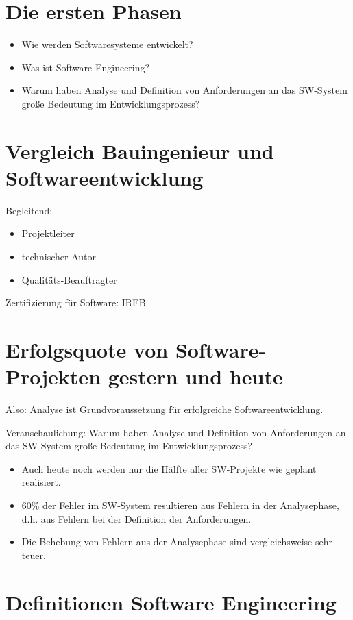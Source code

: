 \section{Die ersten Phasen}
\begin{itemize}
\item Wie werden Softwaresysteme entwickelt?
\item Was ist Software-Engineering?
\item Warum haben Analyse und Definition von Anforderungen an das SW-System große Bedeutung im Entwicklungsprozess?
\end{itemize}

\section{Vergleich Bauingenieur und Softwareentwicklung}
Begleitend:
\begin{itemize}
\item Projektleiter
\item technischer Autor
\item Qualitäts-Beauftragter
\end{itemize}
Zertifizierung für Software: IREB

\section{Erfolgsquote von Software-Projekten gestern und heute}
Also: Analyse ist Grundvoraussetzung für erfolgreiche Softwareentwicklung.

Veranschaulichung:
Warum haben Analyse und Definition von Anforderungen an das SW‐System große Bedeutung
im Entwicklungsprozess?
\begin{itemize}
\item Auch heute noch werden nur die Hälfte aller SW‐Projekte wie geplant realisiert.
\item 60\% der Fehler im SW‐System resultieren aus Fehlern in der Analysephase, d.h. aus Fehlern bei der Definition der Anforderungen.
\item Die Behebung von Fehlern aus der Analysephase sind vergleichsweise sehr teuer.
\end{itemize}

\section{Definitionen Software Engineering}

